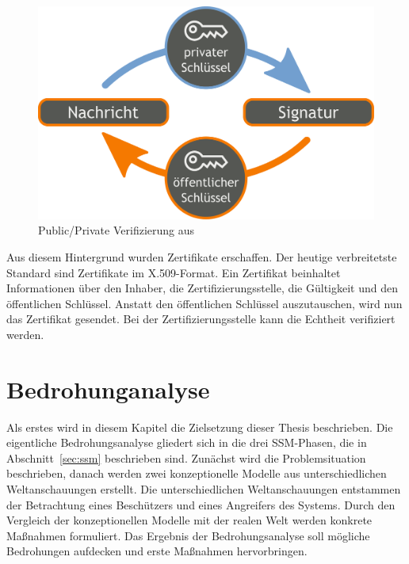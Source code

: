 \documentclass[11pt,a4paper]{report}
\begin{document}
\begin{figure}[htbp]
\centering
\includegraphics[scale=0.2]{images/public_private_verification.pdf}
\caption{Public/Private Verifizierung aus \cite{wiki_asym_crypto}}
\label{fig:pp_veri}
\end{figure}

Aus diesem Hintergrund wurden Zertifikate erschaffen. Der heutige verbreitetste Standard sind Zertifikate im X.509-Format. Ein Zertifikat beinhaltet Informationen über den Inhaber, die Zertifizierungsstelle, die Gültigkeit und den öffentlichen Schlüssel. Anstatt den öffentlichen Schlüssel auszutauschen, wird nun das Zertifikat gesendet. Bei der Zertifizierungsstelle kann die Echtheit verifiziert werden. 

\chapter{Bedrohunganalyse} \label{chap:threat_analysis}

Als erstes wird in diesem Kapitel die Zielsetzung dieser Thesis beschrieben. Die eigentliche Bedrohungsanalyse gliedert sich in die drei SSM-Phasen, die in Abschnitt~\ref{sec:ssm} beschrieben sind. Zunächst wird die Problemsituation beschrieben, danach werden zwei konzeptionelle Modelle aus unterschiedlichen Weltanschauungen erstellt. Die unterschiedlichen Weltanschauungen entstammen der Betrachtung eines Beschützers und eines Angreifers des Systems. Durch den Vergleich der konzeptionellen Modelle mit der realen Welt werden konkrete Maßnahmen formuliert. Das Ergebnis der Bedrohungsanalyse soll mögliche Bedrohungen aufdecken und erste Maßnahmen hervorbringen. 
\end{document}
